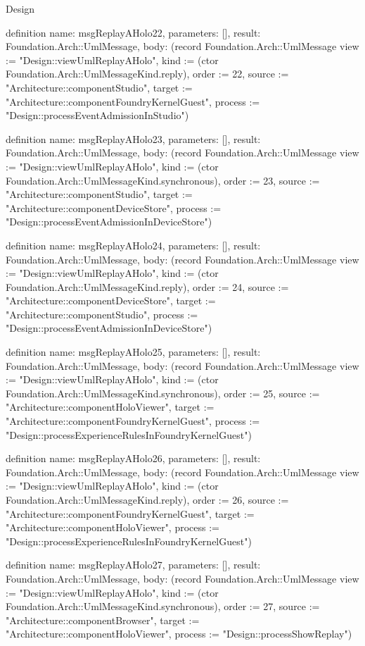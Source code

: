 \begin{lexlean}{Design}
\begin{semanticmodule}
definition{
  name: msgReplayAHolo22,
  parameters: [],
  result: Foundation.Arch::UmlMessage,
  body: (record Foundation.Arch::UmlMessage {view := "Design::viewUmlReplayAHolo", kind := (ctor Foundation.Arch::UmlMessageKind.reply), order := 22, source := "Architecture::componentStudio", target := "Architecture::componentFoundryKernelGuest", process := "Design::processEventAdmissionInStudio"})
}

definition{
  name: msgReplayAHolo23,
  parameters: [],
  result: Foundation.Arch::UmlMessage,
  body: (record Foundation.Arch::UmlMessage {view := "Design::viewUmlReplayAHolo", kind := (ctor Foundation.Arch::UmlMessageKind.synchronous), order := 23, source := "Architecture::componentStudio", target := "Architecture::componentDeviceStore", process := "Design::processEventAdmissionInDeviceStore"})
}

definition{
  name: msgReplayAHolo24,
  parameters: [],
  result: Foundation.Arch::UmlMessage,
  body: (record Foundation.Arch::UmlMessage {view := "Design::viewUmlReplayAHolo", kind := (ctor Foundation.Arch::UmlMessageKind.reply), order := 24, source := "Architecture::componentDeviceStore", target := "Architecture::componentStudio", process := "Design::processEventAdmissionInDeviceStore"})
}

definition{
  name: msgReplayAHolo25,
  parameters: [],
  result: Foundation.Arch::UmlMessage,
  body: (record Foundation.Arch::UmlMessage {view := "Design::viewUmlReplayAHolo", kind := (ctor Foundation.Arch::UmlMessageKind.synchronous), order := 25, source := "Architecture::componentHoloViewer", target := "Architecture::componentFoundryKernelGuest", process := "Design::processExperienceRulesInFoundryKernelGuest"})
}

definition{
  name: msgReplayAHolo26,
  parameters: [],
  result: Foundation.Arch::UmlMessage,
  body: (record Foundation.Arch::UmlMessage {view := "Design::viewUmlReplayAHolo", kind := (ctor Foundation.Arch::UmlMessageKind.reply), order := 26, source := "Architecture::componentFoundryKernelGuest", target := "Architecture::componentHoloViewer", process := "Design::processExperienceRulesInFoundryKernelGuest"})
}

definition{
  name: msgReplayAHolo27,
  parameters: [],
  result: Foundation.Arch::UmlMessage,
  body: (record Foundation.Arch::UmlMessage {view := "Design::viewUmlReplayAHolo", kind := (ctor Foundation.Arch::UmlMessageKind.synchronous), order := 27, source := "Architecture::componentBrowser", target := "Architecture::componentHoloViewer", process := "Design::processShowReplay"})
}


\end{semanticmodule}
\end{lexlean}
